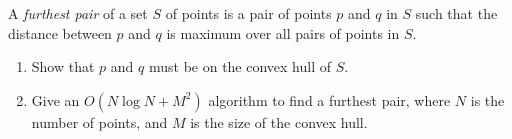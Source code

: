 A {\em furthest pair} of a set $S$ of points is a pair of points $p$
and $q$ in $S$ such that the distance between $p$ and $q$ is maximum
over all pairs of points in $S$.

\begin{enumerate}

\item  Show that $p$ and $q$ must be on the convex hull of $S$.

\item  Give an $O(N \log  N + M^2)$ algorithm to find a furthest pair,
where $N$ is the number of points, and $M$ is the size of the convex hull.

\end{enumerate}
